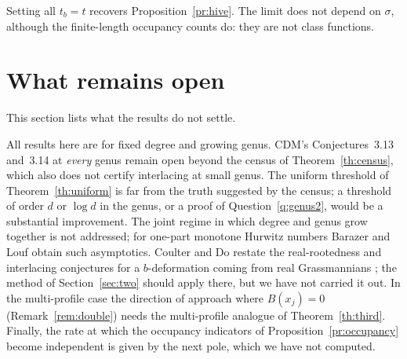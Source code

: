 \documentclass[11pt,a4paper]{article}
\theoremstyle{definition}\newtheorem{definition}[theorem]{Definition}
\theoremstyle{remark}\newtheorem{remark}[theorem]{Remark}\newtheorem{example}[theorem]{Example}
\numberwithin{equation}{section}
\begin{document}
Setting all $t_b=t$ recovers Proposition~\ref{pr:hive}. The limit does not depend on $\sigma$, although the finite-length occupancy counts do: they are not class functions.

\section{What remains open}\label{sec:open}
This section lists what the results do not settle.

All results here are for fixed degree and growing genus. CDM's Conjectures~3.13 and~3.14 at \emph{every} genus remain open beyond the census of Theorem~\ref{th:census}, which also does not certify interlacing at small genus. The uniform threshold of Theorem~\ref{th:uniform} is far from the truth suggested by the census; a threshold of order $d$ or $\log d$ in the genus, or a proof of Question~\ref{q:genus2}, would be a substantial improvement. The joint regime in which degree and genus grow together is not addressed; for one-part monotone Hurwitz numbers Barazer and Louf \cite{bl} obtain such asymptotics. Coulter and Do \cite{cd} restate the real-rootedness and interlacing conjectures for a $b$-deformation coming from real Grassmannians \cite[Conjectures~4.21 and~4.22]{cd}; the method of Section~\ref{sec:two} should apply there, but we have not carried it out. In the multi-profile case the direction of approach where $B(x_j)=0$ (Remark~\ref{rem:double}) needs the multi-profile analogue of Theorem~\ref{th:third}. Finally, the rate at which the occupancy indicators of Proposition~\ref{pr:occupancy} become independent is given by the next pole, which we have not computed.

\appendix
\end{document}
